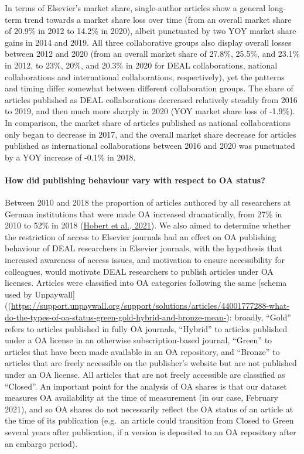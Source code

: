 \documentclass[
]{article}
\begin{document}
In terms of Elsevier's market share, single-author articles show a general long-term trend towards a market share loss over time (from an overall market share of 20.9\% in 2012 to 14.2\% in 2020), albeit punctuated by two YOY market share gains in 2014 and 2019. All three collaborative groups also display overall losses between 2012 and 2020 (from an overall market share of 27.8\%, 25.5\%, and 23.1\% in 2012, to 23\%, 20\%, and 20.3\% in 2020 for DEAL collaborations, national collaborations and international collaborations, respectively), yet the patterns and timing differ somewhat between different collaboration groups. The share of articles published as DEAL collaborations decreased relatively steadily from 2016 to 2019, and then much more sharply in 2020 (YOY market share loss of -1.9\%). In comparison, the market share of articles published as national collaborations only began to decrease in 2017, and the overall market share decrease for articles published as international collaborations between 2016 and 2020 was punctuated by a YOY increase of -0.1\% in 2018.

\hypertarget{how-did-publishing-behaviour-vary-with-respect-to-oa-status}{%
\paragraph{How did publishing behaviour vary with respect to OA status?}\label{how-did-publishing-behaviour-vary-with-respect-to-oa-status}}

Between 2010 and 2018 the proportion of articles authored by all researchers at German institutions that were made OA increased dramatically, from 27\% in 2010 to 52\% in 2018 (\href{https://doi.org/10.1007/s11192-021-04002-0}{Hobert et al., 2021}). We also aimed to determine whether the restriction of access to Elsevier journals had an effect on OA publishing behaviour of DEAL researchers in Elsevier journals, with the hypothesis that increased awareness of access issues, and motivation to ensure accessibility for colleagues, would motivate DEAL researchers to publish articles under OA licenses. Articles were classified into OA categories following the same {[}schema used by Unpaywall{]}((\url{https://support.unpaywall.org/support/solutions/articles/44001777288-what-do-the-types-of-oa-status-green-gold-hybrid-and-bronze-mean-}): broadly, ``Gold'' refers to articles published in fully OA journals, ``Hybrid'' to articles published under a OA license in an otherwise subscription-based journal, ``Green'' to articles that have been made available in an OA repository, and ``Bronze'' to articles that are freely accessible on the publisher's website but are not published under an OA license. All articles that are not freely accessible are classified as ``Closed''. An important point for the analysis of OA shares is that our dataset measures OA availability at the time of measurement (in our case, February 2021), and so OA shares do not necessarily reflect the OA status of an article at the time of its publication (e.g.~an article could transition from Closed to Green several years after publication, if a version is deposited to an OA repository after an embargo period).
\end{document}
